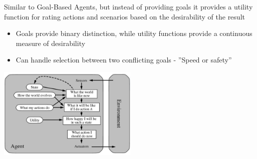 \documentclass[
../../EiKI_Summary.tex,
]
{subfiles}
\begin{document}
\begin{defbox}
    Similar to Goal-Based Agents, but instead of providing goals it provides a utility function for rating actions and scenarios based on the desirability of the result
    \begin{itemize}
        \item Goals provide binary distinction, while utility functions provide a continuous measure of desirability
        \item Can handle selection between two conflicting goals - ''Speed or safety''
    \end{itemize}

    \begin{center}
        \includegraphics[width=0.5\textwidth]{Pics/2/UtilityBasedAgent.png}
    \end{center}
\end{defbox}
\end{document}
